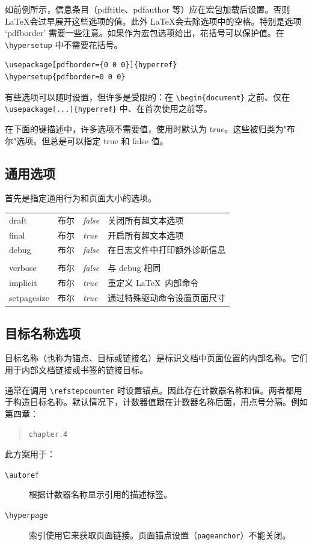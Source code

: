 \documentclass{article}
\newcommand*{\cs}[1]{%
  \texttt{\textbackslash #1}%
}
\begin{document}
如前例所示，信息条目（pdftitle、pdfauthor 等）应在宏包加载后设置。否则 \LaTeX 会过早展开这些选项的值。此外 \LaTeX 会去除选项中的空格。特别是选项 `pdfborder' 需要一些注意。如果作为宏包选项给出，花括号可以保护值。在 \verb|\hypersetup| 中不需要花括号。

\begin{verbatim}
\usepackage[pdfborder={0 0 0}]{hyperref}
\hypersetup{pdfborder=0 0 0}
\end{verbatim}

有些选项可以随时设置，但许多是受限的：在 \verb|\begin{document}| 之前、仅在 \verb|\usepackage[...]{hyperref}| 中、在首次使用之前等。

在下面的键描述中，许多选项不需要值，使用时默认为 true。这些被归类为"布尔"选项。但总是可以指定 true 和 false 值。


\subsection{通用选项}

首先是指定通用行为和页面大小的选项。

\medskip
\begin{longtable}{>{\ttfamily}ll>{\itshape}ll}
draft          & 布尔 & false & 关闭所有超文本选项 \\
final          & 布尔 & true  & 开启所有超文本选项 \\
debug          & 布尔 & false & 在日志文件中打印额外诊断信息 \\
               &         &       &  \\
verbose        & 布尔 & false & 与 debug 相同 \\
implicit       & 布尔 & true  & 重定义 \LaTeX\ 内部命令 \\
setpagesize    & 布尔 & true  & 通过特殊驱动命令设置页面尺寸
\end{longtable}

\subsection{目标名称选项}


目标名称（也称为锚点、目标或链接名）是标识文档中页面位置的内部名称。它们用于内部文档链接或书签的链接目标。

通常在调用 \cs{refstepcounter} 时设置锚点。因此存在计数器名称和值。两者都用于构造目标名称。默认情况下，计数器值跟在计数器名称后面，用点号分隔。例如第四章：
\begin{quote}
  \verb|chapter.4|
\end{quote}
此方案用于：
\begin{description}
\item[\cs{autoref}] 根据计数器名称显示引用的描述标签。
\item[\cs{hyperpage}] 索引使用它来获取页面链接。页面锚点设置（\verb|pageanchor|）不能关闭。
\end{description}
\end{document}

